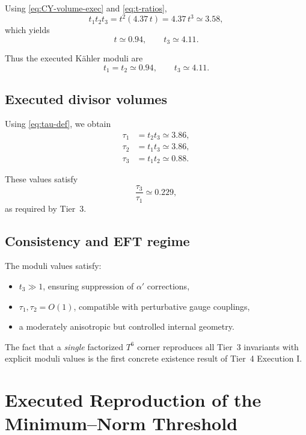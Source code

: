\documentclass[11pt]{article}
\begin{document}
Using \eqref{eq:CY-volume-exec} and \eqref{eq:t-ratios},
\[
t_1 t_2 t_3
=
t^2 (4.37\, t)
=
4.37\, t^3
\simeq
3.58,
\]
which yields
\begin{equation}
t
\simeq
0.94,
\qquad
t_3 \simeq 4.11.
\end{equation}

Thus the executed K\"ahler moduli are
\begin{equation}
\boxed{
t_1 = t_2 \simeq 0.94,
\qquad
t_3 \simeq 4.11.
}
\label{eq:t-exec}
\end{equation}

\subsection{Executed divisor volumes}

Using \eqref{eq:tau-def}, we obtain
\begin{align}
\tau_1 &= t_2 t_3 \simeq 3.86, \\
\tau_2 &= t_1 t_3 \simeq 3.86, \\
\tau_3 &= t_1 t_2 \simeq 0.88.
\end{align}

These values satisfy
\[
\frac{\tau_3}{\tau_1} \simeq 0.229,
\]
as required by Tier~3.

\subsection{Consistency and EFT regime}

The moduli values satisfy:
\begin{itemize}
  \item $t_3 \gg 1$, ensuring suppression of $\alpha'$ corrections,
  \item $\tau_1,\tau_2 = O(1)$, compatible with perturbative gauge
        couplings,
  \item a moderately anisotropic but controlled internal geometry.
\end{itemize}

\begin{remark}
The fact that a \emph{single} factorized $T^6$ corner reproduces all
Tier~3 invariants with explicit moduli values is the first concrete
existence result of Tier~4 Execution I.
\end{remark}
\section{Executed Reproduction of the Minimum--Norm Threshold}
\label{sec:threshold-executed}
\end{document}
